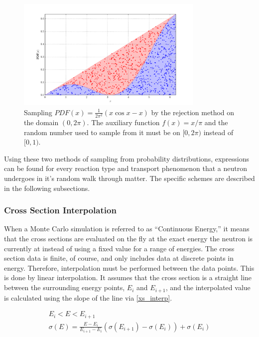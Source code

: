 \begin{figure}[h!] 
  \centering
    \includegraphics[width=0.8\textwidth]{graphics/rejection_samp.pdf}
     \caption{Sampling $PDF(x)=\frac{1}{2\pi^2}(x \cos x - x)$ by the rejection method on the domain $(0,2\pi)$.  The auxiliary function $f(x)=x/\pi$ and the random number used to sample from it must be on $[0,2\pi)$ instead of $[0,1)$. \label{rejection_samp}}
\end{figure}

Using these two methods of sampling from probability distributions, expressions can be found for every reaction type and transport phenomenon that a neutron undergoes in it's random walk through matter.  The specific schemes are described in the following subsections.

\subsubsection{Cross Section Interpolation}

When a Monte Carlo simulation is referred to as ``Continuous Energy,'' it means that the cross sections are evaluated on the fly at the exact energy the neutron is currently at instead of using a fixed value for a range of energies.  The cross section data is finite, of course, and only includes data at discrete points in energy.  Therefore, interpolation must be performed between the data points.  This is done by linear interpolation.  It assumes that the cross section is a straight line between the surrounding energy points, $E_i$ and $E_{i+1}$, and the interpolated value is calculated using the slope of the line via \eqref{xs_interp}.

 \begin{equation}
\label{xs_interp}
\begin{gathered}
E_i < E < E_{i+1} \\
\sigma(E) = \frac{E-E_i}{E_{i+1}-E_i}(\sigma(E_{i+1})-\sigma(E_i)) + \sigma(E_i)
\end{gathered}
\end{equation}

